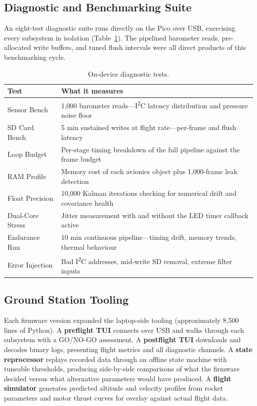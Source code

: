 \documentclass[11pt, a4paper]{article}
\begin{document}
\subsection{Diagnostic and Benchmarking Suite}

An eight-test diagnostic suite runs directly on the Pico over USB, exercising every subsystem in isolation (Table~\ref{tab:diag}). The pipelined barometer reads, pre-allocated write buffers, and tuned flush intervals were all direct products of this benchmarking cycle.

\figTimingBudget

\begin{table}[h]
\centering
\small
\caption{On-device diagnostic tests.}
\label{tab:diag}
\begin{tabularx}{\textwidth}{l X}
\toprule
\textbf{Test} & \textbf{What it measures} \\
\midrule
Sensor Bench    & 1,000 barometer reads---I\textsuperscript{2}C latency distribution and pressure noise floor \\
SD Card Bench   & 5 min sustained writes at flight rate---per-frame and flush latency \\
Loop Budget     & Per-stage timing breakdown of the full pipeline against the frame budget \\
RAM Profile     & Memory cost of each avionics object plus 1,000-frame leak detection \\
Float Precision & 10,000 Kalman iterations checking for numerical drift and covariance health \\
Dual-Core Stress & Jitter measurement with and without the LED timer callback active \\
Endurance Run   & 10 min continuous pipeline---timing drift, memory trends, thermal behaviour \\
Error Injection & Bad I\textsuperscript{2}C addresses, mid-write SD removal, extreme filter inputs \\
\bottomrule
\end{tabularx}
\end{table}

\subsection{Ground Station Tooling}

Each firmware version expanded the laptop-side tooling (approximately 8,500 lines of Python). A \textbf{preflight TUI} connects over USB and walks through each subsystem with a GO/NO-GO assessment. A \textbf{postflight TUI} downloads and decodes binary logs, presenting flight metrics and all diagnostic channels. A \textbf{state reprocessor} replays recorded data through an offline state machine with tuneable thresholds, producing side-by-side comparisons of what the firmware decided versus what alternative parameters would have produced. A \textbf{flight simulator} generates predicted altitude and velocity profiles from rocket parameters and motor thrust curves for overlay against actual flight data.
\end{document}
